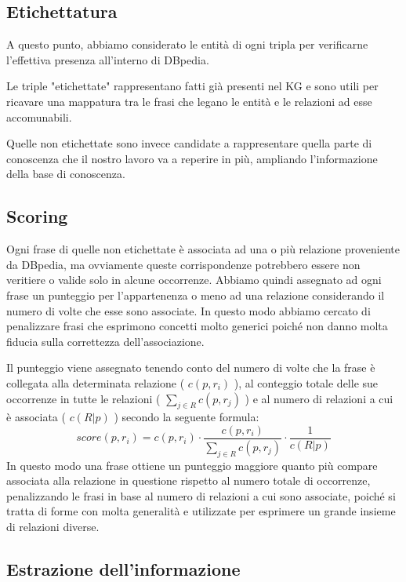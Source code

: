 \documentclass[10pt,a4paper,twocolumn]{article}
\begin{document}
\subsection{Etichettatura}
A questo punto, abbiamo considerato le entità di ogni tripla per verificarne l'effettiva presenza all'interno di DBpedia.

Le triple "etichettate" rappresentano fatti già presenti nel KG e sono utili per ricavare una mappatura tra le frasi che legano le entità e le relazioni ad esse accomunabili.

Quelle non etichettate sono invece candidate a rappresentare quella parte di conoscenza che il nostro lavoro va a reperire in più, ampliando l'informazione della base di conoscenza.

\subsection{Scoring}

Ogni frase di quelle non etichettate è associata ad una o più relazione proveniente da DBpedia, ma ovviamente queste corrispondenze potrebbero essere non veritiere o valide solo in alcune occorrenze. Abbiamo quindi assegnato ad ogni frase un punteggio per l'appartenenza o meno ad una relazione considerando il numero di volte che esse sono associate. In questo modo abbiamo cercato di penalizzare frasi che esprimono concetti molto generici poiché non danno molta fiducia sulla correttezza dell'associazione.

Il punteggio viene assegnato tenendo conto del numero di volte che la frase è collegata alla determinata relazione ( $c(p,r_i)$ ), al conteggio totale delle sue occorrenze in tutte le relazioni ( $\sum_{j \in R} c(p,r_j)$ ) e al numero di relazioni a cui è associata ( $c(R|p)$ ) secondo la seguente formula:
\[score(p,r_i)=c(p,r_i)\cdot\frac{c(p,r_i)}{\sum_{j \in R}c(p,r_j)}\cdot \frac{1}{c(R|p)} \]
In questo modo una frase ottiene un punteggio maggiore quanto più compare associata alla relazione in questione rispetto al numero totale di occorrenze, penalizzando le frasi in base al numero di relazioni a cui sono associate, poiché si tratta di forme con molta generalità e utilizzate per esprimere un grande insieme di relazioni diverse. 

\subsection{Estrazione dell'informazione}
\end{document}
